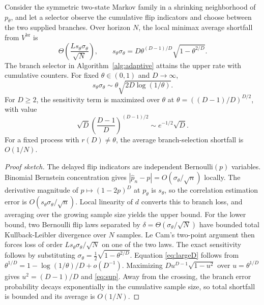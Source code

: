 \begin{theorem}\label{thm:adapt}
Consider the symmetric two-state Markov family in a shrinking neighborhood of
$p_\theta$, and let a selector observe the cumulative flip indicators and choose
between the two supplied branches. Over horizon $N$, the local minimax average
shortfall from $V^{\mathrm{br}}$ is
\begin{equation}\label{eq:rate}
\Theta\!\left(\frac{L s_\theta\sigma_\theta}{\sqrt N}\right),
\qquad
s_\theta\sigma_\theta
=D\theta^{(D-1)/D}\sqrt{1-\theta^{2/D}}.
\end{equation}
The branch selector in Algorithm~\ref{alg:adaptive} attains the upper rate with
cumulative counters. For fixed $\theta\in(0,1)$ and $D\to\infty$,
\begin{equation}\label{eq:largeD}
s_\theta\sigma_\theta
\sim \theta\sqrt{2D\log(1/\theta)}.
\end{equation}
For $D\ge2$, the sensitivity term is maximized over $\theta$ at
$\theta=((D-1)/D)^{D/2}$, with value
\begin{equation}\label{eq:sup}
\sqrt D\left(\frac{D-1}{D}\right)^{(D-1)/2}
\sim e^{-1/2}\sqrt D.
\end{equation}
For a fixed process with $r(D)\neq\theta$, the average branch-selection
shortfall is $O(1/N)$.
\end{theorem}
\begin{proof}[Proof sketch]
The delayed flip indicators are independent Bernoulli$(p)$ variables. Binomial
Bernstein concentration gives
$|\hat p_n-p|=O(\sigma_\theta/\sqrt n)$ locally. The derivative magnitude of
$p\mapsto(1-2p)^D$ at $p_\theta$ is $s_\theta$, so the correlation estimation
error is $O(s_\theta\sigma_\theta/\sqrt n)$. Local linearity of $d$ converts this
to branch loss, and averaging over the growing sample size yields the upper
bound. For the lower bound, two Bernoulli flip laws separated by
$\delta=\Theta(\sigma_\theta/\sqrt N)$ have bounded total Kullback-Leibler
divergence over $N$ samples. Le Cam's two-point argument \cite{tsybakov} then
forces loss of order $L s_\theta\sigma_\theta/\sqrt N$ on one of the two laws.
The exact sensitivity follows by substituting
$\sigma_\theta=\tfrac12\sqrt{1-\theta^{2/D}}$. Equation \eqref{eq:largeD} follows
from $\theta^{1/D}=1-\log(1/\theta)/D+o(D^{-1})$. Maximizing
$D u^{D-1}\sqrt{1-u^2}$ over $u=\theta^{1/D}$ gives
$u^2=(D-1)/D$ and \eqref{eq:sup}. Away from the crossing, the branch error
probability decays exponentially in the cumulative sample size, so total
shortfall is bounded and its average is $O(1/N)$.
\end{proof}

